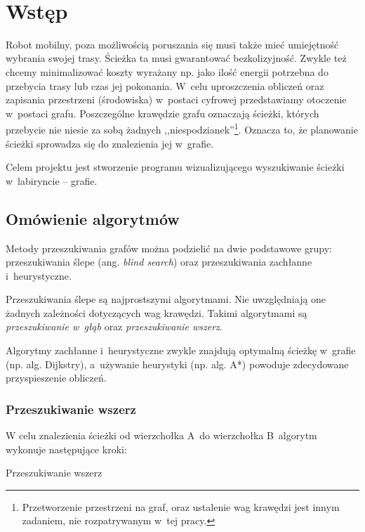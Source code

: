 \documentclass[11pt,a4paper,oneside]{mwart}
\begin{document}



\newpage
\thispagestyle{empty}
~~~~~~~~~~~~~~
\newpage

\setcounter{tocdepth}{3}
\tableofcontents
\newpage

\section{Wstęp}

Robot mobilny, poza możliwością poruszania się musi także mieć umiejętność wybrania swojej trasy.
Ścieżka ta musi gwarantować bezkolizyjność. 
Zwykle też chcemy minimalizować koszty wyrażany np. jako ilość energii potrzebna do przebycia trasy 
lub czas jej pokonania.
W~celu uproszczenia obliczeń oraz zapisania przestrzeni (środowiska) w~postaci cyfrowej przedstawiamy 
otoczenie w~postaci grafu. 
Poszczególne krawędzie grafu oznaczają ścieżki, których przebycie nie niesie za sobą żadnych 
,,niespodzianek''\footnote{Przetworzenie przestrzeni na graf, oraz ustalenie wag krawędzi jest innym 
zadaniem, nie rozpatrywanym w~tej pracy.}.
Oznacza to, że planowanie ścieżki sprowadza się do znalezienia jej w~grafie.

Celem projektu jest stworzenie programu wizualizującego wyszukiwanie ścieżki w~labiryncie -- grafie.

\subsection{Omówienie algorytmów}

Metody przeszukiwania grafów można podzielić na dwie podstawowe grupy: 
przeszukiwania ślepe (ang. \emph{blind search}) oraz przeszukiwania zachłanne i~heurystyczne.

Przeszukiwania ślepe są najprostszymi algorytmami. 
Nie uwzględniają one żadnych zależności dotyczących wag krawędzi.
Takimi algorytmami są \emph{przeszukiwanie w~głąb} oraz \emph{przeszukiwanie wszerz}.

Algorytmy zachłanne i~heurystyczne zwykle znajdują optymalną ścieżkę w~grafie 
(np. alg. Dijkstry), a~używanie heurystyki (np. alg. A*) powoduje zdecydowane przyspieszenie obliczeń.

\subsubsection{Przeszukiwanie wszerz}
W celu znalezienia ścieżki od wierzchołka A~do wierzchołka B~algorytm wykonuje następujące kroki:
\begin{algorithm}
\caption{Przeszukiwanie wszerz}
\label{algorytm_wszerz}
\begin{algorithmic}[1]
		\ENDIF
	\ENDFOR
\ENDWHILE
\end{algorithmic}
\end{algorithm}
\end{document}
